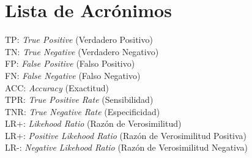 \thispagestyle{empty}
\section*{Lista de Acrónimos}

TP: \textit{True Positive} (Verdadero Positivo) \\
TN: \textit{True Negative} (Verdadero Negativo) \\
FP: \textit{False Positive} (Falso Positivo) \\
FN: \textit{False Negative} (Falso Negativo) \\
ACC: \textit{Accuracy} (Exactitud) \\
TPR: \textit{True Positive Rate} (Sensibilidad) \\
TNR: \textit{True Negative Rate} (Especificidad) \\
LR+: \textit{Likehood Ratio} (Razón de Verosimilitud) \\
LR+: \textit{Positive Likehood Ratio} (Razón de Verosimilitud Positiva) \\
LR-: \textit{Negative Likehood Ratio} (Razón de Verosimilitud Negativa)

\clearpage